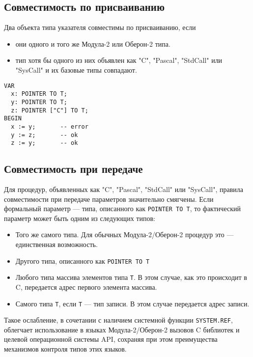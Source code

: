 \subsection{Совместимость по присваиванию}

Два объекта типа указателя совместимы по присваиванию, если

\begin{itemize}
\item они одного и того же Модула-2 или Оберон-2 типа.
\item тип хотя бы одного из них объявлен как
      "C", "Pascal", "StdCall" или "SysCall" и их базовые типы совпадают.
\end{itemize}

\begin{verbatim}
VAR
  x: POINTER TO T;
  y: POINTER TO T;
  z: POINTER ["C"] TO T;
BEGIN
  x := y;       -- error
  y := z;       -- ok
  z := y;       -- ok
\end{verbatim}

\subsection{Совместимость при передаче}
\label{multilang:parmcomp}

Для процедур, объявленных как "C", "Pascal", "StdCall" или "SysCall",
правила совместимости при передаче параметров значительно смягчены.
Если формальный параметр --- типа, описанного как {\tt POINTER TO T},
то фактический параметр может быть одним из следующих типов:

\begin{itemize}
\item 
Того же самого типа. Для обычных Модула-2/Оберон-2 процедур это ---
единственная возможность.
\item Другого типа, описанного как {\tt POINTER TO T}
\item 
Любого типа массива элементов типа {\tt T}.
В этом случае, как это происходит в C, передается адрес первого элемента
массива.
\item Самого типа {\tt T}, если {\tt T} --- тип записи. В этом случае
передается адрес записи.
\end{itemize}

Такое ослабление, в сочетании с наличием системной функции
{\tt SYSTEM.REF}, облегчает использование в языках
Модула-2/Оберон-2 вызовов C библиотек и целевой операционной системы
API, сохраняя при этом преимущества механизмов контроля типов этих языков.

